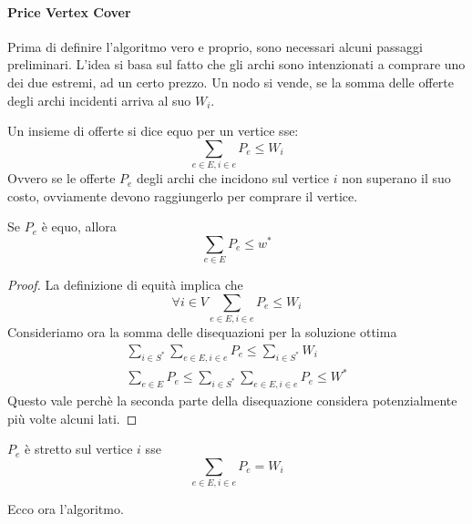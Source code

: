 \paragraph{Price Vertex Cover}
Prima di definire l'algoritmo vero e proprio, sono necessari alcuni passaggi preliminari.
L'idea si basa sul fatto che gli archi sono intenzionati a comprare uno dei due estremi,
ad un certo prezzo.
Un nodo si vende, se la somma delle offerte degli archi incidenti arriva al suo $W_i$.
\begin{definition}
    Un insieme di offerte si dice equo per un vertice sse:
    $$\sum_{e\in E, i \in e}P_e \leq W_i$$
    Ovvero se le offerte $P_e$ degli archi che incidono sul vertice $i$ 
    non superano il suo costo, ovviamente devono raggiungerlo per comprare 
    il vertice.    
\end{definition}
\begin{lemma}
    \label{pscl1}
    Se $P_e$ è equo, allora
    $$\sum_{e \in E} P_e \leq w^*$$
\end{lemma}
\begin{proof}
    La definizione di equità implica che
    $$\forall i \in V \sum_{e\in E, i \in e}P_e \leq W_i$$
    Consideriamo ora la somma delle disequazioni per la soluzione ottima
\begin{equation}
    \begin{aligned}
        \sum_{i \in S^*} \sum_{e\in E, i \in e}P_e \leq \sum_{i \in S^*}W_i\\
        \sum_{e \in E} P_e \leq \sum_{i \in S^*} \sum_{e\in E, i \in e}P_e \leq W^*
    \end{aligned}
\end{equation}
Questo vale perchè la seconda parte della disequazione considera potenzialmente più volte alcuni lati.
\end{proof}
\begin{definition}
    $P_e$ è stretto sul vertice $i$ sse
    $$\sum_{e \in E, i \in e} P_e = W_i$$
\end{definition}
Ecco ora l'algoritmo.

